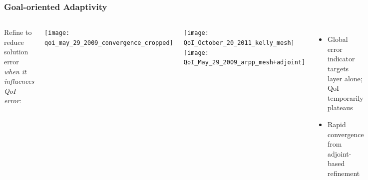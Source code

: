 \documentclass[mathserif]{beamer}
\begin{document}
\begin{frame}
\frametitle{Goal-oriented Adaptivity}

\begin{columns}

Refine to reduce solution error {\emph{when it influences QoI error}}:

\begin{center}
\texttt{[image: qoi\_may\_29\_2009\_convergence\_cropped]}
\end{center}


\begin{center}
\texttt{[image: QoI\_October\_20\_2011\_kelly\_mesh]}
\texttt{[image: QoI\_May\_29\_2009\_arpp\_mesh+adjoint]}
\end{center}

\begin{itemize}
\item Global error indicator targets layer alone; QoI temporarily plateaus
\item Rapid convergence from adjoint-based refinement
\end{itemize}

\end{columns}

\end{frame}
\end{document}
